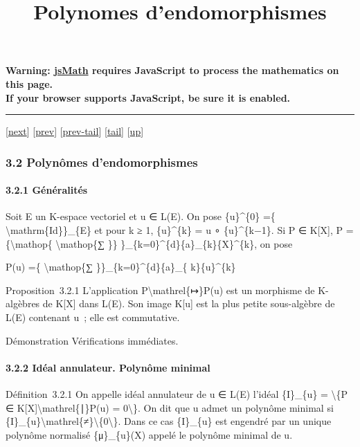 \documentclass[]{article}
\title{Polynomes d'endomorphismes}
\author{}
\date{}
\begin{document}
\maketitle

\textbf{Warning: \href{http://www.math.union.edu/locate/jsMath}{jsMath}
requires JavaScript to process the mathematics on this page.\\ If your
browser supports JavaScript, be sure it is enabled.}

\begin{center}\rule{3in}{0.4pt}\end{center}

{[}\href{coursse17.html}{next}{]} {[}\href{coursse15.html}{prev}{]}
{[}\href{coursse15.html\#tailcoursse15.html}{prev-tail}{]}
{[}\hyperref[tailcoursse16.html]{tail}{]}
{[}\href{coursch4.html\#coursse16.html}{up}{]}

\subsubsection{3.2 Polynômes d'endomorphismes}

\paragraph{3.2.1 Généralités}

Soit E un K-espace vectoriel et u ∈ L(E). On pose \{u\}\^{}\{0\} =\{
\textbackslash{}mathrm\{Id\}\}\_\{E\} et pour k ≥ 1, \{u\}\^{}\{k\} = u
∘ \{u\}\^{}\{k−1\}. Si P ∈ K{[}X{]}, P =\{\textbackslash{}mathop\{
\textbackslash{}mathop\{∑ \}\}
\}\_\{k=0\}\^{}\{d\}\{a\}\_\{k\}\{X\}\^{}\{k\}, on pose

P(u) =\{ \textbackslash{}mathop\{∑ \}\}\_\{k=0\}\^{}\{d\}\{a\}\_\{
k\}\{u\}\^{}\{k\}

Proposition~3.2.1 L'application P\textbackslash{}mathrel\{↦\}P(u) est un
morphisme de K-algèbres de K{[}X{]} dans L(E). Son image K{[}u{]} est la
plus petite sous-algèbre de L(E) contenant u~; elle est commutative.

Démonstration Vérifications immédiates.

\paragraph{3.2.2 Idéal annulateur. Polynôme minimal}

Définition~3.2.1 On appelle idéal annulateur de u ∈ L(E) l'idéal
\{I\}\_\{u\} = \textbackslash{}\{P ∈
K{[}X{]}\textbackslash{}mathrel\{∣\}P(u) = 0\textbackslash{}\}. On dit
que u admet un polynôme minimal si
\{I\}\_\{u\}\textbackslash{}mathrel\{≠\}\textbackslash{}\{0\textbackslash{}\}.
Dans ce cas \{I\}\_\{u\} est engendré par un unique polynôme normalisé
\{μ\}\_\{u\}(X) appelé le polynôme minimal de u.
\end{document}

